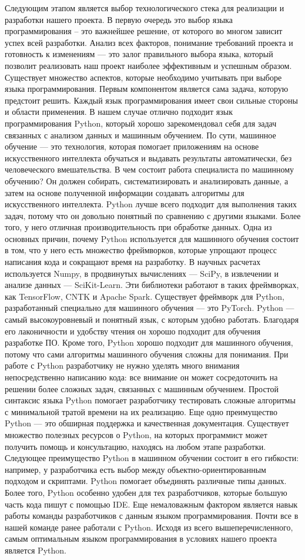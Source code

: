    Следующим этапом является выбор технологического стека для реализации и разработки нашего проекта. В первую очередь это выбор языка программирования – это важнейшее решение, от которого во многом зависит успех всей разработки. Анализ всех факторов, понимание требований проекта и готовность к изменениям — это залог правильного выбора языка, который позволит реализовать наш проект наиболее эффективным и успешным образом. Существует множество аспектов, которые необходимо учитывать при выборе языка программирования. Первым компонентом является сама задача, которую предстоит решить. Каждый язык программирования имеет свои сильные стороны и области применения.  В нашем случае отлично подходит язык программирования Python, который хорошо зарекомендовал себя для задач связанных с анализом данных и машинным обучением. По сути, машинное обучение — это технология, которая помогает приложениям на основе искусственного интеллекта обучаться и выдавать результаты автоматически, без человеческого вмешательства. В чем состоит работа специалиста по машинному обучению? Он должен собирать, систематизировать и анализировать данные, а затем на основе полученной информации создавать алгоритмы для искусственного интеллекта. Python лучше всего подходит для выполнения таких задач, потому что он довольно понятный по сравнению с другими языками. Более того, у него отличная производительность при обработке данных. Одна из основных причин, почему Python используется для машинного обучения состоит в том, что у него есть множество фреймворков, которые упрощают процесс написания кода и сокращают время на разработку. В научных расчетах используется Numpy, в продвинутых вычислениях — SciPy, в извлечении и анализе данных — SciKit-Learn. Эти библиотеки работают в таких фреймворках, как TensorFlow, CNTK и Apache Spark. Существует фреймворк для Python, разработанный специально для машинного обучения — это PyTorch. Python — самый высокоуровневый и понятный язык, с которым удобно работать. Благодаря его лаконичности и удобству чтения он хорошо подходит для обучения разработке ПО. Кроме того, Python хорошо подходит для машинного обучения, потому что сами алгоритмы машинного обучения сложны для понимания. При работе с Python разработчику не нужно уделять много внимания непосредственно написанию кода: все внимание он может сосредоточить на решении более сложных задач, связанных с машинным обучением. Простой синтаксис языка Python помогает разработчику тестировать сложные алгоритмы с минимальной тратой времени на их реализацию. Еще одно преимущество Python — это обширная поддержка и качественная документация. Существует множество полезных ресурсов о Python, на которых программист может получить помощь и консультацию, находясь на любом этапе разработки. Следующее преимущество Python в машинном обучении состоит в его гибкости: например, у разработчика есть выбор между объектно-ориентированным подходом и скриптами. Python помогает объединять различные типы данных. Более того, Python особенно удобен для тех разработчиков, которые большую часть кода пишут с помощью IDE. Еще немаловажным фактором является навык работы команды разработчиков с данным языком программирования. Почти все в нашей команде ранее работали с Python. Исходя из всего вышеперечисленного, самым оптимальным языком программирования в условиях нашего проекта является Python.

